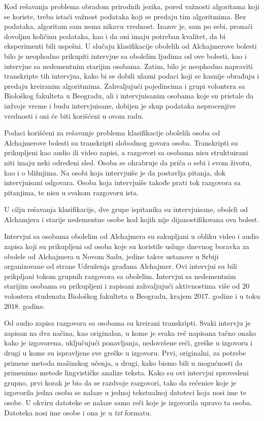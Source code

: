 \documentclass[12pt,oneside]{memoir}
\begin{document}
Kod rešavanja problema obradom prirodnih jezika, pored važnosti algoritama koji se koriste, treba istaći važnost podataka koji se predaju tim algoritmima.  Bez podataka, algoritam sam nema nikavu vrednost. Izazov je, sam po sebi, pronaći dovoljnu količinu podataka, kao i da oni imaju potreban kvalitet, da bi eksperimenti bili uspešni. U slučaju klasifikacije obolelih od Alchajmerove bolesti bilo je neophodno prikupiti intervjue sa obolelim ljudima od ove bolesti, kao i intervjue sa nedementnim starijim osobama. Zatim, bilo je neophodno napraviti transkripte tih intervjua, kako bi se dobili ulazni podaci koji se kasnije obrađuju i predaju kreiranim algoritmima. Zahvaljujući pojedincima i grupi volontera sa Biološkog fakulteta u Beogradu, ali i intervjuisanim osobama koje su pristale da izdvoje vreme i budu intervjuisane, dobijen je skup podataka neprocenjive vrednosti i oni će biti korišćeni u ovom radu.

Podaci korišćeni za rešavanje problema klasifikacije obolelih osoba od Alchajmerove bolesti su transkripti slobodnog govora osoba. Transkripti su prikupljeni kao audio ili video zapisi, a razgovori sa osobama nisu struktuirani niti imaju neki određeni sled. Osoba se ohrabruje da priča o sebi i svom životu, kao i o bližnjima. Na osobi koja intervjuiše je da postavlja pitanja, dok intervjuisani odgovara. Osoba koja intervjuiše takođe prati tok razgovora sa pitanjima, te nisu u svakom razgovoru ista.

U cilju rešavanja klasifikacije, dve grupe ispitanika su intervjuisane, oboleli od Alchamjera i starije nedementne osobe kod kojih nije dijanostifikovana ova bolest.

Intervjui sa osobama obolelim od Alchajmera su sakupljani u obliku video i audio zapisa koji su prikupljeni od osoba koje su koristile usluge dnevnog boravka za obolele od Alchajmera u Novom Sadu, jedine takve ustanove u Srbiji organizovane od strane Udruženja građana Alchajmer. Ovi intervjui su bili prikpljani tokom grupnih razgovora sa obolelim. Intervjui sa nedementnim starijim osobama su prikupljeni i zapisani zahvaljujući aktivnostima više od 20 volontera studenata Biološkog fakulteta u Beogradu, krajem 2017. godine i u toku 2018. godine.

Od audio zapisa razgovora sa osobama su kreirani transkripti. Svaki intervju je zapisan na dva načina, kao originalan, u kome je svaka reč napisana tačno onako kako je izgovorena, uključujući ponavljanja, nedovršene reči, greške u izgovoru i drugi u kome su ispravljene sve greške u izgovoru. Prvi, originalni, za potrebe primene metoda mašinskog učenja, a drugi, kako bismo bili u mogućnosti da primenimo metode lingvističke analize teksta. Kako su ovi intervjui sprovedeni grupno, prvi korak je bio da se razdvoje razgovori, tako da rečenice koje je izgovorila jedna osoba se nalaze u jednoj tekstualnoj datoteci koja nosi ime te osobe. U okviru datoteke se nalaze samo reči koje je izgovorila upravo ta osoba. Datoteka nosi ime osobe i ona je u \textit{txt} formatu.
\end{document}
